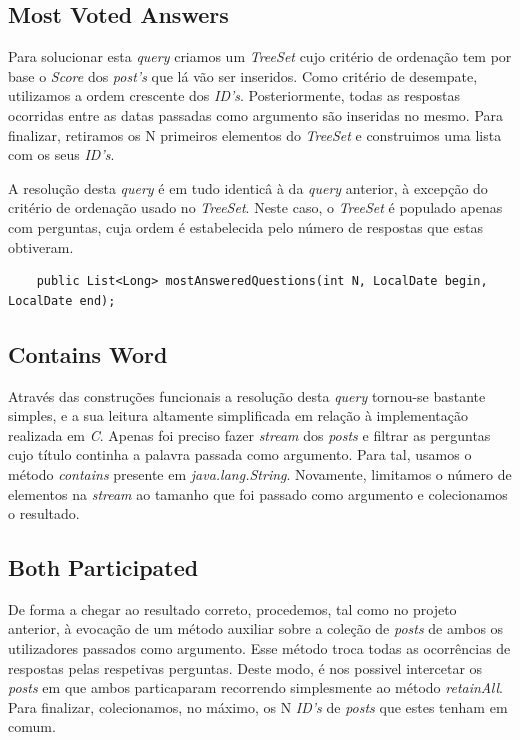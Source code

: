 \documentclass[a4paper, 11pt, oneside]{article}
\begin{document}
\subsection{Most Voted Answers}

Para solucionar esta \textit{query} criamos um \textit{TreeSet} cujo critério de ordenação tem por base o \textit{Score} dos \textit{post's} que lá vão ser inseridos. Como critério de desempate, utilizamos a ordem crescente dos \textit{ID's}. Posteriormente, todas as respostas ocorridas entre as datas passadas como argumento são inseridas no mesmo. Para finalizar, retiramos os N primeiros elementos do \textit{TreeSet} e construimos uma lista com os seus \textit{ID's}.



A resolução desta \textit{query} é em tudo identicâ à da \textit{query} anterior, à excepção do critério de ordenação usado no \textit{TreeSet}. Neste caso, o \textit{TreeSet} é populado apenas com perguntas, cuja ordem é estabelecida pelo número de respostas que estas obtiveram.

\begin{lstlisting}
	public List<Long> mostAnsweredQuestions(int N, LocalDate begin, LocalDate end);
\end{lstlisting}



\subsection{Contains Word}

Através das construções funcionais a resolução desta \textit{query} tornou-se bastante simples, e a sua leitura altamente simplificada em relação à implementação realizada em \textit{C}. Apenas foi preciso fazer \textit{stream} dos \textit{posts} e filtrar as perguntas cujo título continha a palavra passada como argumento. Para tal, usamos o método \textit{contains} presente em \textit{java.lang.String}. Novamente, limitamos o número de elementos na \textit{stream} ao tamanho que foi passado como argumento e colecionamos o resultado.



\subsection{Both Participated}

De forma a chegar ao resultado correto, procedemos, tal como no projeto anterior, à evocação de um método auxiliar sobre a coleção de \textit{posts} de ambos os utilizadores passados como argumento. Esse método troca todas as ocorrências de respostas pelas respetivas perguntas. Deste modo, é nos possivel intercetar os \textit{posts} em que ambos particaparam recorrendo simplesmente ao método \textit{retainAll}. Para finalizar, colecionamos, no máximo, os N \textit{ID's} de \textit{posts} que estes tenham em comum.
\end{document}
